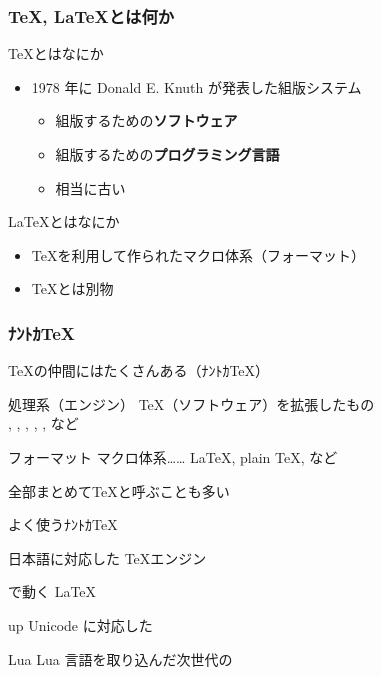\documentclass[aspectratio=149,10pt,t,]{beamer}
\newcommand{\hmemph}[1]{\textbf{#1}}
\begin{document}
\begin{frame}
	\frametitle{\TeX, \LaTeX とは何か}
	\begin{block}{\TeX とはなにか}
		\begin{itemize}
			\item 1978 年に Donald E. Knuth が発表した組版システム
				\begin{itemize}
					\item 組版するための\hmemph{ソフトウェア}
					\item 組版するための\hmemph{プログラミング言語}
					\item 相当に古い
				\end{itemize}
		\end{itemize}
	\end{block}
	\begin{block}{\LaTeX とはなにか}
		\begin{itemize}
			\item \TeX を利用して作られたマクロ体系（フォーマット）
			\item \TeX とは別物
		\end{itemize}
	\end{block}
\end{frame}

\begin{frame}
	\frametitle{ﾅﾝﾄｶ\TeX}
	\begin{block}{\TeX の仲間にはたくさんある（ﾅﾝﾄｶ\TeX ）}
		\begin{desc}
			\item[処理系（エンジン）] \TeX （ソフトウェア）を拡張したもの\\
				\eTeX, \pdfTeX, \XeTeX, \LuaTeX, \pTeX, \upTeX など
			\item[フォーマット] マクロ体系……
				\LaTeX, plain \TeX, \ConTeXt など
		\end{desc}
		全部まとめて\TeX と呼ぶことも多い
	\end{block}
	\begin{block}{よく使うﾅﾝﾄｶ\TeX}
		\begin{desc}
			\item[\pTeX] 日本語に対応した \TeX エンジン
			\item[\pLaTeX] \pTeX で動く \LaTeX
			\item[up\LaTeXTeX] Unicode に対応した \LaTeXTeX
			\item[Lua\LaTeXTeX] Lua 言語を取り込んだ次世代の \LaTeXTeX
		\end{desc}
	\end{block}
\end{frame}
\end{document}
